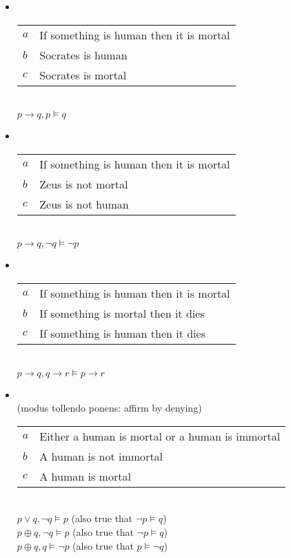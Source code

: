 \documentclass[headrule,footrule]{foils}
\begin{document}
\begin{itemize}
\item {}
\\[2ex]
  \begin{tabular}{ll}
    $a$ & If something is human then it is mortal \\
    $b$ & Socrates is human \\ \hline
    $c$ & Socrates is mortal
  \end{tabular}
\\ $p \rightarrow q, p \models q$
\item {}
\\[2ex]
  \begin{tabular}{ll}
    $a$ & If something is human then it is mortal \\
    $b$ & Zeus is not mortal \\ \hline
    $c$ & Zeus is not human
  \end{tabular}
\\ $p \rightarrow q, \neg q \models \neg p$

\newpage
\item {}
\\[2ex]
 \begin{tabular}{ll}
    $a$ & If something is human then it is mortal \\
    $b$ & If something is mortal then it dies \\ \hline
    $c$ & If something is human then it dies
  \end{tabular}
\\ $p \rightarrow q, q \rightarrow r \models p \rightarrow r$
\item {}
\\ (modus tollendo ponens: affirm by denying)
\\[2ex]
 \begin{tabular}{ll}
    $a$ & Either a human is mortal or a human is immortal \\
    $b$ & A human is not immortal \\ \hline
    $c$ & A human is mortal
  \end{tabular}
\\ $p \vee q, \neg q \models p$  (also true that $\neg p \models q$)
\\ $p \oplus q, \neg q \models p$  (also true that $\neg p \models q$)
\\ $p \oplus q, q \models \neg p$  (also true that $p \models \neg q$)
\end{itemize}
\end{document}
